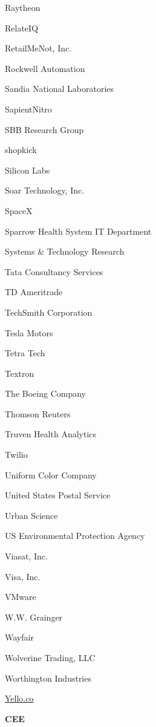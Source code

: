 \documentclass[twoside]{article}
\begin{document}
\begin{center}
\begin{multicols}{5}
\begin{FlushLeft}
\begin{compactitem}
\item Raytheon
\item RelateIQ
\item RetailMeNot, Inc.
\item Rockwell Automation
\item Sandia National Laboratories
\item SapientNitro
\item SBB Research Group
\item shopkick
\item Silicon Labs
\item Soar Technology, Inc.
\item SpaceX
\item Sparrow Health System IT Department
\item Systems \& Technology Research
\item Tata Consultancy Services
\item TD Ameritrade
\item TechSmith Corporation
\item Tesla Motors
\item Tetra Tech
\item Textron
\item The Boeing Company
\item Thomson Reuters
\item Truven Health Analytics
\item Twilio
\item Uniform Color Company
\item United States Postal Service
\item Urban Science
\item US Environmental Protection Agency
\item Viasat, Inc.
\item Visa, Inc.
\item VMware
\item W.W. Grainger
\item Wayfair
\item Wolverine Trading, LLC
\item Worthington Industries
\item \url{Yello.co}
\end{compactitem}
        \end{FlushLeft}
        \vspace{1em}
        {\fontsize{14}{16}\selectfont \bf CEE}\\
        \vspace{-1em}
        ~\hrulefill~
        \vspace{-.9em}

\end{multicols}
\end{center}
\end{document}
